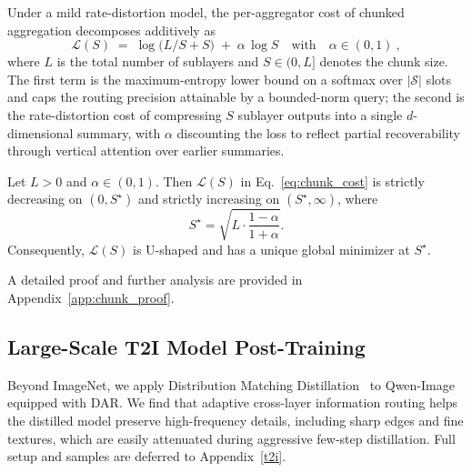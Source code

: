 \documentclass{llmxive}
\begin{document}
Under a mild rate-distortion model, the per-aggregator cost of chunked aggregation decomposes additively as
\begin{equation}
\mathcal{L}(S) \;=\; \log\bigl(L/S + S\bigr) \;+\; \alpha \, \log S 
\quad\text{with}\quad \alpha \in (0, 1) \ ,
\label{eq:chunk_cost}
\end{equation}
where $L$ is the total number of sublayers and $S \in (0, L]$ denotes the chunk size. The first term is the maximum-entropy lower bound on a softmax over $|\mathcal{S}|$ slots and caps the routing precision attainable by a bounded-norm query; the second is the rate-distortion cost of compressing $S$ sublayer outputs into a single $d$-dimensional summary, with $\alpha$ discounting the loss to reflect partial recoverability through vertical attention over earlier summaries.

\begin{proposition} \label{prop:u_shape}
Let $L>0$ and $\alpha\in(0,1)$. Then $\mathcal{L}(S)$ in
Eq.~\eqref{eq:chunk_cost} is strictly decreasing on $(0,S^\star)$ and strictly
increasing on $(S^\star,\infty)$, where
\begin{equation}
S^\star=\sqrt{L \cdot \frac{1-\alpha}{1+\alpha}}.
\label{eq:S_star}
\end{equation}
Consequently, $\mathcal{L}(S)$ is U-shaped and has a unique global minimizer at
$S^\star$.
\end{proposition}

A detailed proof and further analysis are provided in Appendix~\ref{app:chunk_proof}.

\subsection{Large-Scale T2I Model Post-Training}

Beyond ImageNet, we apply Distribution Matching Distillation~\citep{yin2024one,yin2024improved} to Qwen-Image~\citep{wu2025qwen} equipped with \textsc{DAR}. We find that adaptive cross-layer information routing helps the distilled model preserve high-frequency details, including sharp edges and fine textures, which are easily attenuated during aggressive few-step distillation. Full setup and samples are deferred to Appendix~\ref{t2i}.
\end{document}
